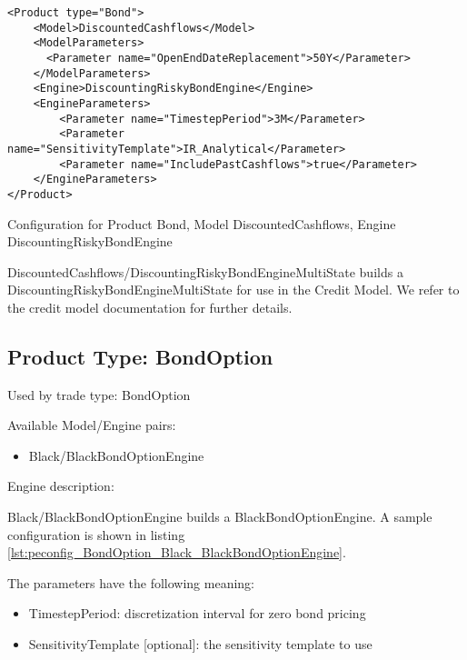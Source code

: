 \begin{longlisting}
\begin{verbatim}
<Product type="Bond">
    <Model>DiscountedCashflows</Model>
    <ModelParameters>
      <Parameter name="OpenEndDateReplacement">50Y</Parameter>
    </ModelParameters>
    <Engine>DiscountingRiskyBondEngine</Engine>
    <EngineParameters>
        <Parameter name="TimestepPeriod">3M</Parameter>
        <Parameter name="SensitivityTemplate">IR_Analytical</Parameter>
        <Parameter name="IncludePastCashflows">true</Parameter>
    </EngineParameters>
</Product>
\end{verbatim}
\caption{Configuration for Product Bond, Model DiscountedCashflows, Engine DiscountingRiskyBondEngine}
\label{lst:peconfig_Bond_DiscountedCashflows_DiscountingRiskyBondEngine}
\end{longlisting}

DiscountedCashflows/DiscountingRiskyBondEngineMultiState builds a DiscountingRiskyBondEngineMultiState for use in the
Credit Model. We refer to the credit model documentation for further details.

\subsection{Product Type: BondOption}

Used by trade type: BondOption

Available Model/Engine pairs:

\begin{itemize}
\item Black/BlackBondOptionEngine
\end{itemize}

Engine description:

Black/BlackBondOptionEngine builds a BlackBondOptionEngine. A sample configuration is shown in listing
\ref{lst:peconfig_BondOption_Black_BlackBondOptionEngine}.

The parameters have the following meaning:

\begin{itemize}
\item TimestepPeriod: discretization interval for zero bond pricing
\item SensitivityTemplate [optional]: the sensitivity template to use 
\end{itemize}

